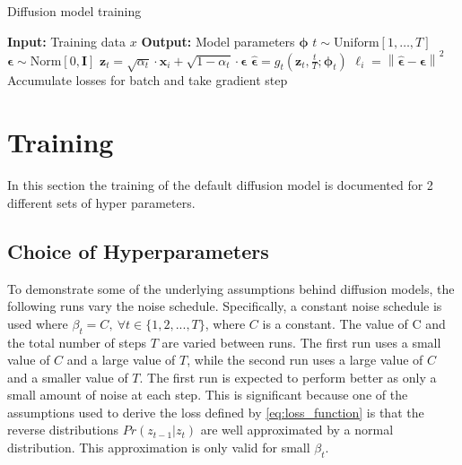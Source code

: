 \documentclass[11pt]{article}
\begin{document}
\begin{algorithm}
\caption{Diffusion model training}
\begin{algorithmic}[1]
\State \textbf{Input:} Training data $x$
\State \textbf{Output:} Model parameters $\boldsymbol{\phi}$
 
     
        \State $t \sim \text{Uniform}[1, \ldots, T]$ 
        \State $\boldsymbol{\epsilon} \sim \text{Norm}[0, \mathbf{I}]$ 
        \State $\boldsymbol{\mathbf{z}}_{t} = \sqrt{\alpha_t} \cdot \mathbf{x}_i + \sqrt{1 - \alpha_t} \cdot \boldsymbol{\epsilon}$ 
        \State $\hat{\boldsymbol{\epsilon}} = g_t \left( \boldsymbol{\mathbf{z}}_{t}, \frac{t}{T}; \boldsymbol{\phi}_t \right)$ 
        \State $\ell_i = \left\|\hat{\boldsymbol{\epsilon}} - \boldsymbol{\epsilon} \right\|^2$ 
    \EndFor
    \State Accumulate losses for batch and take gradient step
\EndWhile
\end{algorithmic}
\end{algorithm}
\section{Training}
In this section the training of the default diffusion model is documented for 2 different sets of hyper parameters.
\subsection{Choice of Hyperparameters}
To demonstrate some of the underlying assumptions behind diffusion models, the following runs vary the noise schedule.
Specifically, a constant noise schedule is used where $\beta_t = C, \ \forall t \in \{1,2,...,T\}$, where $C$ is a constant.
The value of C and the total number of steps $T$ are varied between runs. The first run uses a small value of $C$ and a large value of $T$, while the second run uses a large value of $C$ and a smaller value of $T$. The first run is expected to perform better as only a small amount of noise at each step. This is significant because one of the assumptions used to derive the loss defined by \ref{eq:loss_function} is that the reverse distributions $Pr(z_{t-1}|z_{t})$ are well approximated by a normal distribution. This approximation is only valid for small $\beta_t$.
\end{document}
